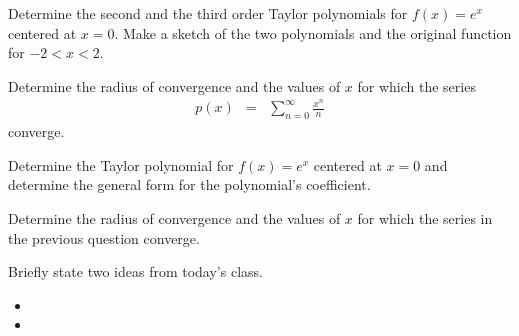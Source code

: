 
\begin{problem}
\item Determine the second and the third order Taylor polynomials for
  $f(x)=e^x$ centered at $x=0$. Make a sketch of the two polynomials
  and the original function for $-2 < x < 2$.

  \vfill

  \clearpage

\item Determine the radius of convergence and the values of $x$ for
  which the series
  \begin{eqnarray*}
    p(x) & = & \sum^\infty_{n=0} \frac{x^n}{n}
  \end{eqnarray*}
  converge.

  \vfill

\end{problem}


\begin{problem}
\item Determine the Taylor polynomial for $f(x)=e^x$ centered at $x=0$
  and determine the general form for the polynomial's coefficient.

  \vfill


  \clearpage

\item Determine the radius of convergence and the values of $x$ for
  which the series in the previous question converge.

  \vfill


\end{problem}


\postClass

\begin{problem}
\item Briefly state two ideas from today's class.
  \begin{itemize}
  \item
  \item
  \end{itemize}
\item
  \begin{subproblem}
    \item
  \end{subproblem}
\end{problem}





